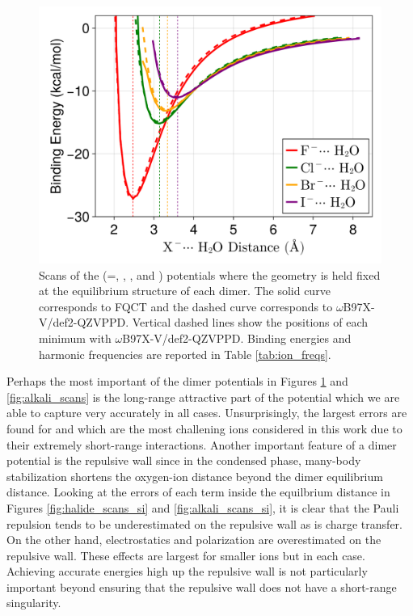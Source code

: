\documentclass[journal=jctcce,manuscript=article]{achemso}
\begin{document}
\begin{figure}[h]
  \includegraphics*[width=\textwidth]{figures/anion_dimer_scans.png}
  \caption{Scans of the  (=, , , and )
  potentials where the geometry is held fixed at the equilibrium structure of each dimer.
  The solid curve corresponds to FQCT and the dashed curve corresponds to $\omega$B97X-V/def2-QZVPPD.
  Vertical dashed lines show the positions of each minimum with $\omega$B97X-V/def2-QZVPPD.
  Binding energies and harmonic frequencies are reported in Table \ref{tab:ion_freqs}.
  }\label{fig:halide_scans}
\end{figure}

Perhaps the most important of the dimer potentials in Figures \ref{fig:halide_scans} and \ref{fig:alkali_scans} is the long-range attractive part of the potential which we are able to capture very accurately in all cases. Unsurprisingly, the largest errors are found for  and  which are the most challening ions considered in this work due to their extremely short-range interactions. Another important feature of a dimer potential is the repulsive wall since in the condensed phase, many-body stabilization shortens the oxygen-ion distance beyond the dimer equilibrium distance. Looking at the errors of each term inside the equilbrium distance in Figures \ref{fig:halide_scans_si} and \ref{fig:alkali_scans_si}, it is clear that the Pauli repulsion tends to be underestimated on the repulsive wall as is charge transfer. On the other hand, electrostatics and polarization are overestimated on the repulsive wall. These effects are largest for smaller ions but in each case. Achieving accurate energies high up the repulsive wall is not particularly important beyond ensuring that the repulsive wall does not have a short-range singularity.
\end{document}
